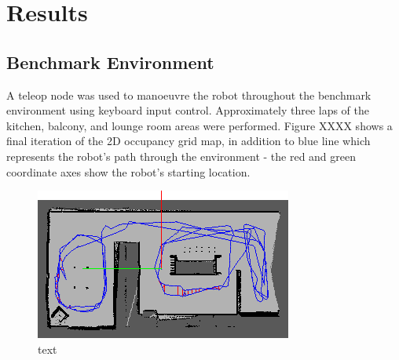 \documentclass[a4paper]{article}
\begin{document}
\section{Results}
\subsection{Benchmark Environment}
A teleop node was used to manoeuvre the robot throughout the benchmark environment using keyboard input control. Approximately three laps of the kitchen, balcony, and lounge room areas were performed. Figure XXXX shows a final iteration of the 2D occupancy grid map, in addition to blue line which represents the robot's path through the environment - the red and green coordinate axes show the robot's starting location.
\begin{figure}[h]
\centering
\includegraphics[scale=0.8]{kitchen_graph_view}
\caption{text}
\end{figure}
\end{document}

